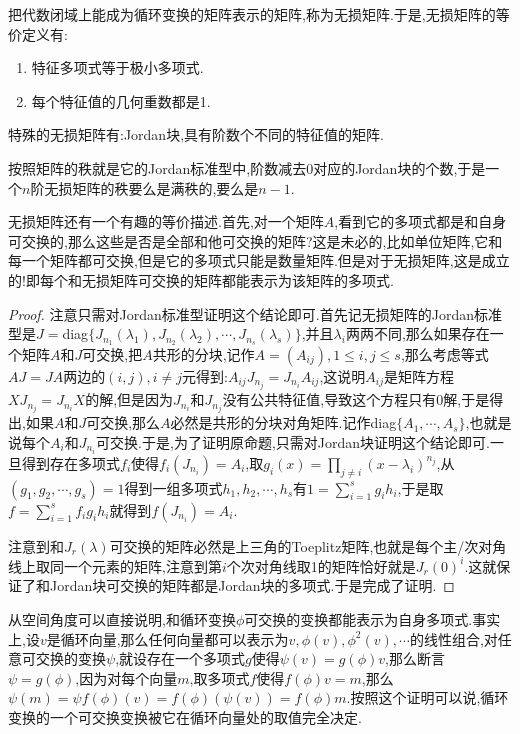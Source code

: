 把代数闭域上能成为循环变换的矩阵表示的矩阵,称为无损矩阵.于是,无损矩阵的等价定义有:
\begin{enumerate}
	\item 特征多项式等于极小多项式.
	\item 每个特征值的几何重数都是1.
\end{enumerate}

特殊的无损矩阵有:Jordan块,具有阶数个不同的特征值的矩阵.

按照矩阵的秩就是它的Jordan标准型中,阶数减去0对应的Jordan块的个数,于是一个$n$阶无损矩阵的秩要么是满秩的,要么是$n-1$.

无损矩阵还有一个有趣的等价描述.首先,对一个矩阵$A$,看到它的多项式都是和自身可交换的,那么这些是否是全部和他可交换的矩阵?这是未必的,比如单位矩阵,它和每一个矩阵都可交换,但是它的多项式只能是数量矩阵.但是对于无损矩阵,这是成立的!即每个和无损矩阵可交换的矩阵都能表示为该矩阵的多项式.

\begin{proof}
	
	注意只需对Jordan标准型证明这个结论即可.首先记无损矩阵的Jordan标准型是$J=$diag$\{J_ {n_1}(\lambda_1),J_{n_2}(\lambda_2),\cdots,J_{n_s}(\lambda_s)\}$,并且$\lambda_i$两两不同,那么如果存在一个矩阵$A$和$J$可交换,把$A$共形的分块,记作$A=(A_{ij}),1\le i,j\le s$,那么考虑等式$AJ=JA$两边的$(i,j),i\not=j$元得到:$A_{ij}J_{n_j}=J_{n_i}A_{ij}$,这说明$A_ {ij}$是矩阵方程$XJ_{n_j}=J_{n_i}X$的解,但是因为$J_{n_i}$和$J_{n_j}$没有公共特征值,导致这个方程只有0解,于是得出,如果$A$和$J$可交换,那么$A$必然是共形的分块对角矩阵.记作diag$\{A_1,\cdots,A_s\}$,也就是说每个$A_i$和$J_{n_i}$可交换.于是,为了证明原命题,只需对Jordan块证明这个结论即可.一旦得到存在多项式$f_i$使得$f_i(J_ {n_i})=A_i$,取$g_i(x)=\prod_{j\not=i}(x-\lambda_i)^{n_j}$,从$(g_1,g_2,\cdots,g_s)=1$得到一组多项式$h_1,h_2,\cdots,h_s$有$1=\sum_{i=1}^{s}g_ih_i$,于是取$f=\sum_{i=1}^{s}f_ig_ih_i$就得到$f(J_{n_i})=A_i$.
	
	注意到和$J_r(\lambda)$可交换的矩阵必然是上三角的Toeplitz矩阵,也就是每个主/次对角线上取同一个元素的矩阵,注意到第$i$个次对角线取1的矩阵恰好就是$J_r(0)^i$.这就保证了和Jordan块可交换的矩阵都是Jordan块的多项式.于是完成了证明.
	
\end{proof}

从空间角度可以直接说明,和循环变换$\phi$可交换的变换都能表示为自身多项式.事实上,设$v$是循环向量,那么任何向量都可以表示为$v,\phi(v),\phi^2(v),\cdots$的线性组合,对任意可交换的变换$\psi$,就设存在一个多项式$g$使得$\psi(v)=g(\phi)v$,那么断言$\psi=g(\phi)$,因为对每个向量$m$,取多项式$f$使得$f(\phi)v=m$,那么$\psi(m)=\psi f (\phi)(v)=f(\phi)(\psi(v))=f(\phi)m$.按照这个证明可以说,循环变换的一个可交换变换被它在循环向量处的取值完全决定.

